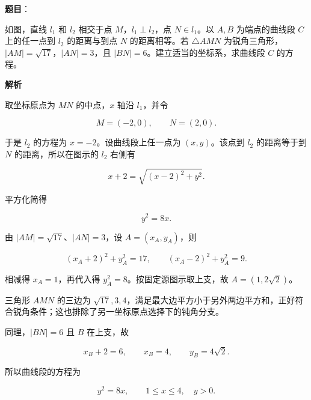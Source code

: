 \begin{answer}

\textbf{题目}：

如图，直线 $l_1$ 和 $l_2$ 相交于点 $M$，$l_1\perp l_2$，点 $N\in l_1$。以 $A,B$ 为端点的曲线段 $C$ 上的任一点到 $l_2$ 的距离与到点 $N$ 的距离相等。若 $\triangle AMN$ 为锐角三角形，$|AM|=\sqrt{17}$，$|AN|=3$，且 $|BN|=6$。建立适当的坐标系，求曲线段 $C$ 的方程。
\nopagebreak[4]
\begin{center}\end{center}
\nopagebreak[4]
\textbf{解析}

取坐标原点为 $MN$ 的中点，$x$ 轴沿 $l_1$，并令

\nopagebreak[4]
\[
M=(-2,0),\qquad N=(2,0).
\]

于是 $l_2$ 的方程为 $x=-2$。设曲线段上任一点为 $(x,y)$。该点到 $l_2$ 的距离等于到 $N$ 的距离，所以在图示的 $l_2$ 右侧有

\nopagebreak[4]
\[
x+2=\sqrt{(x-2)^2+y^2}.
\]

平方化简得

\nopagebreak[4]
\[
y^2=8x.
\]

由 $|AM|=\sqrt{17}$、$|AN|=3$，设 $A=(x_A,y_A)$，则

\nopagebreak[4]
\[
(x_A+2)^2+y_A^2=17,\qquad
(x_A-2)^2+y_A^2=9.
\]

相减得 $x_A=1$，再代入得 $y_A^2=8$。按固定源图示取上支，故 $A=(1,2\sqrt2)$。

三角形 $AMN$ 的三边为 $\sqrt{17},3,4$，满足最大边平方小于另外两边平方和，正好符合锐角条件；这也排除了另一坐标原点选择下的钝角分支。

同理，$|BN|=6$ 且 $B$ 在上支，故

\nopagebreak[4]
\[
x_B+2=6,\qquad x_B=4,\qquad y_B=4\sqrt2.
\]

所以曲线段的方程为

\nopagebreak[4]
\[
y^2=8x,\qquad 1\leqslant x\leqslant4,\quad y>0.
\]


\end{answer}
